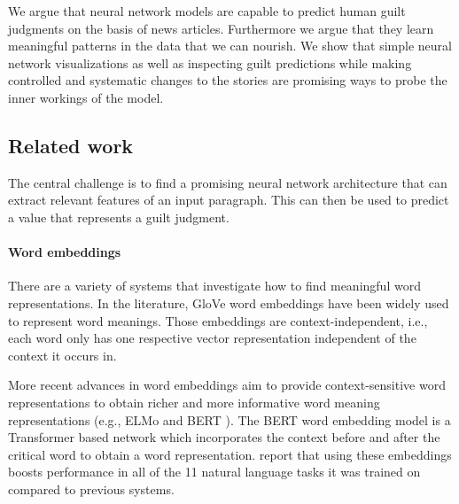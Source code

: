 \documentclass[11pt,a4paper]{article}
\newcommand{\ek}[1]{\textcolor{Orange}{[ek: #1]}}
\begin{document}
We argue that neural network models are capable to predict human guilt judgments on the basis of news articles. Furthermore we argue that they learn meaningful patterns in the data that we can nourish. We show that simple neural network visualizations as well as inspecting guilt predictions while making controlled and systematic changes to the stories are promising ways to probe the inner workings of the model.



\subsection{Related work}

The central challenge is to find a promising neural network architecture that can extract relevant features of an input paragraph. This can then be used to predict a value that represents a guilt judgment.

\paragraph{Word embeddings}
There are a variety of systems that investigate how to find meaningful word representations. In the literature, GloVe word embeddings \citep{Pennington:2014} have been widely used to represent word meanings. Those embeddings are context-independent, i.e., each word only has one respective vector representation independent of the context it occurs in.

More recent advances in word embeddings aim to provide context-sensitive word representations to obtain richer and more informative word meaning representations (e.g., ELMo \cite{Peters:2018} and BERT \cite{Devlin:2018}). The BERT word embedding model is a Transformer based network which incorporates the context before and after the critical word to obtain a word representation. \citeauthor{Devlin:2018} report that using these embeddings boosts performance in all of the 11 natural language tasks it was trained on compared to previous systems.
\end{document}
